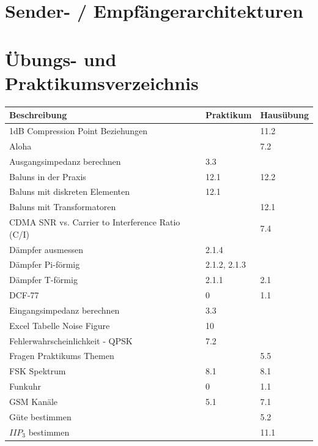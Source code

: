 \section{Sender- / Empfängerarchitekturen }
\newpage
\section{Übungs- und Praktikumsverzeichnis}
\renewcommand{\arraystretch}{0.85}
\begin{tabular}{|l|l|l|}
\hline
{\bf Beschreibung} & {\bf Praktikum} & {\bf Hausübung} \\
\hline
1dB Compression Point Beziehungen &            &       11.2 \\
\hline
     Aloha &            &        7.2 \\
\hline
Ausgangsimpedanz berechnen &        3.3 &            \\
\hline
Baluns in der Praxis &       12.1 &       12.2 \\
\hline
Baluns mit diskreten Elementen &       12.1 &            \\
\hline
Baluns mit Transformatoren &            &       12.1 \\
\hline
CDMA SNR vs. Carrier to Interference Ratio (C/I) &            &        7.4 \\
\hline
Dämpfer ausmessen &      2.1.4 &            \\
\hline
Dämpfer Pi-förmig & 2.1.2, 2.1.3 &            \\
\hline
Dämpfer T-förmig &      2.1.1 &        2.1 \\
\hline
   DCF-77  &          0 &        1.1 \\
\hline
Eingangsimpedanz berechnen &        3.3 &            \\
\hline
Excel Tabelle Noise Figure &         10 &            \\
\hline
Fehlerwahrscheinlichkeit - QPSK &        7.2 &            \\
\hline
Fragen Praktikums Themen &            &        5.5 \\
\hline
FSK Spektrum &        8.1 &        8.1 \\
\hline
   Funkuhr &          0 &        1.1 \\
\hline
GSM Kanäle &        5.1 &        7.1 \\
\hline
Güte bestimmen &            &        5.2 \\
\hline
$IIP_3$ bestimmen &            &       11.1 \\

\end{tabular}
